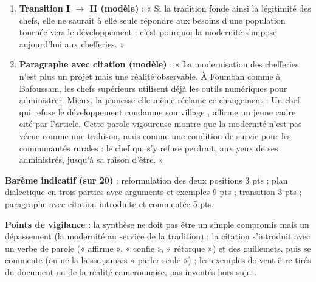 \documentclass[11pt]{article}
\begin{document}
\begin{corrige}
\begin{enumerate}
\textbf{III. Synthèse : une gouvernance locale peut concilier tradition et modernité.}
\begin{itemize}
\item Idée directrice : la modernité est un outil, la tradition une légitimité ; l'une peut servir l'autre.
\item Argument 1 : le chef moderne reste légitime s'il respecte les rites tout en utilisant les outils modernes. \emph{Exemple} : un sultan qui gère l'état civil par ordinateur sans renier les cérémonies d'intronisation.
\item Argument 2 : le Cameroun offre des modèles de coexistence. \emph{Exemple} : les chefferies Bamoun qui conjuguent musée, patrimoine et administration numérique.
\end{itemize}

\item \textbf{Transition I $\rightarrow$ II (modèle)} : « Si la tradition fonde ainsi la légitimité des chefs, elle ne saurait à elle seule répondre aux besoins d'une population tournée vers le développement : c'est pourquoi la modernité s'impose aujourd'hui aux chefferies. »

\item \textbf{Paragraphe avec citation (modèle)} : « La modernisation des chefferies n'est plus un projet mais une réalité observable. À Foumban comme à Bafoussam, les chefs supérieurs utilisent déjà les outils numériques pour administrer. Mieux, la jeunesse elle-même réclame ce changement : \og Un chef qui refuse le développement condamne son village \fg{}, affirme un jeune cadre cité par l'article. Cette parole vigoureuse montre que la modernité n'est pas vécue comme une trahison, mais comme une condition de survie pour les communautés rurales : le chef qui s'y refuse perdrait, aux yeux de ses administrés, jusqu'à sa raison d'être. »
\end{enumerate}

\textbf{Barème indicatif (sur 20)} : reformulation des deux positions 3 pts ; plan dialectique en trois parties avec arguments et exemples 9 pts ; transition 3 pts ; paragraphe avec citation introduite et commentée 5 pts.

\textbf{Points de vigilance} : la synthèse ne doit pas être un simple compromis mais un dépassement (la modernité au service de la tradition) ; la citation s'introduit avec un verbe de parole (« affirme », « confie », « rétorque ») et des guillemets, puis se commente (on ne la laisse jamais « parler seule ») ; les exemples doivent être tirés du document ou de la réalité camerounaise, pas inventés hors sujet.
\end{corrige}
\end{document}
